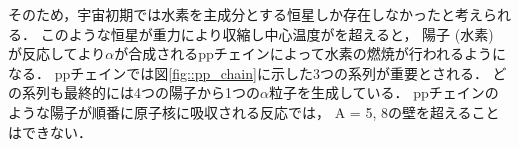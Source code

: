 \documentclass[../master]{subfiles}
\begin{document}
そのため，宇宙初期では水素を主成分とする恒星しか存在しなかったと考えられる．
このような恒星が重力により収縮し中心温度がを超えると，
陽子 (水素) が反応してより$\alpha$が合成されるppチェインによって水素の燃焼が行われるようになる．
ppチェインでは図\ref{fig::pp_chain}に示した3つの系列が重要とされる．
どの系列も最終的には4つの陽子から1つの$\alpha$粒子を生成している．
ppチェインのような陽子が順番に原子核に吸収される反応では，
A = 5, 8の壁を超えることはできない．
\end{document}
